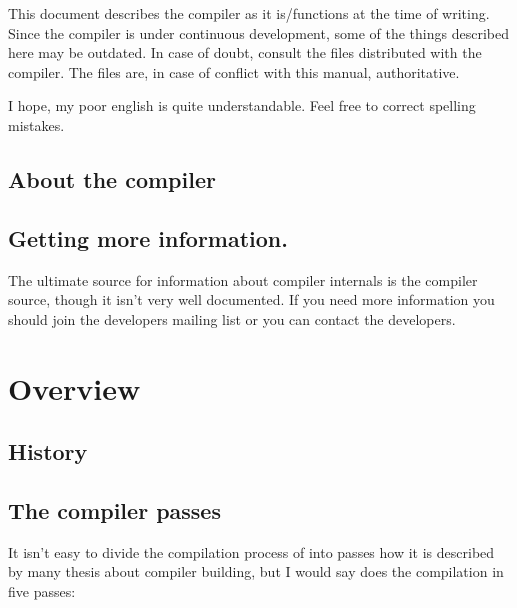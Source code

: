 This document describes the compiler as it is/functions at the time of
writing. Since the compiler is under continuous development, some of the
things described here may be outdated. In case of doubt, consult the
 files distributed with the compiler.
The  files are, in case of conflict with this manual,
authoritative.

I hope, my poor english is quite understandable. Feel free to correct
spelling mistakes.

\section{About the compiler}

\section{Getting more information.}

The ultimate source for information about compiler internals is
the compiler source, though it isn't very well documented. If you
need more information you should join the developers mailing
list or you can contact the developers.

\chapter{Overview}

\section{History}

\section{The compiler passes}

It isn't easy to divide the compilation process of \fpc into passes
how it is described by many thesis about compiler building,
but I would say \fpc does the compilation in five passes:

